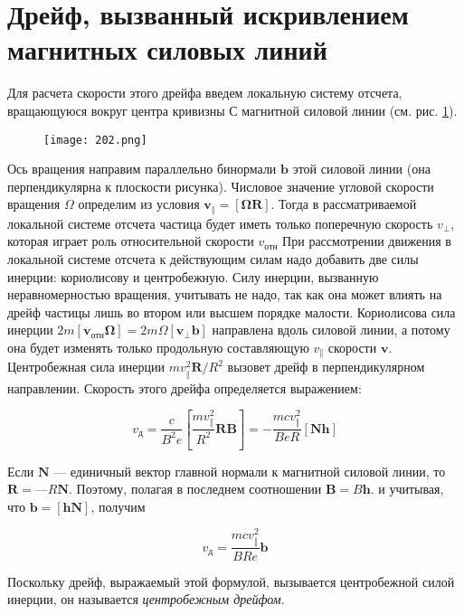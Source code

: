 \section{Дрейф, вызванный искривлением магнитных силовых линий} 

Для расчета скорости этого дрейфа введем локальную систему отсчета, вращающуюся вокруг центра кривизны $С$ магнитной силовой линии (см. рис. \ref{202}).

\begin{figure}[h!]
    \centering
    \texttt{[image: 202.png]}
    \caption{}
    \label{202}
\end{figure}

Ось вращения направим параллельно бинормали $\mathbf{b}$ этой силовой линии (она перпендикулярна к плоскости рисунка). Числовое значение угловой скорости вращения $\Omega$ определим из условия $\mathbf{v_{\Vert}} = [\mathbf{\Omega R}]$. Тогда в рассматриваемой локальной системе отсчета частица будет иметь только поперечную скорость $v_{\perp}$, которая играет роль относительной скорости $v_{отн}$ При рассмотрении движения в локальной системе отсчета к действующим силам надо добавить две силы инерции: кориолисову и центробежную. Силу инерции, вызванную неравномерностью вращения, учитывать не надо, так как она может влиять на дрейф частицы лишь во втором или высшем порядке малости. Кориолисова сила инерции $2m [\mathbf{v_{отн} \Omega}] = 2m \Omega [\mathbf{v_{\perp} b}]$ направлена вдоль силовой линии, а потому она будет изменять только продольную составляющую $v_{\Vert}$ скорости $\mathbf{v}$. Центробежная сила инерции $m v_{\Vert}^2 \mathbf{R} / R^2$ вызовет дрейф в перпендикулярном направлении. Скорость этого дрейфа определяется выражением:

\[
    v_д = \frac{c}{B^2 e} \left[ \frac{m v_{\Vert}^2}{R^2} \mathbf{R B} \right] = - \frac{m c v_{\Vert}^2}{B e R} [\mathbf{N h}]
\]

Если $\mathbf{N}$ — единичный вектор главной нормали к магнитной силовой линии, то $\mathbf{R} = — R \mathbf{N}$. Поэтому, полагая в последнем соотношении $\mathbf{B} = B \mathbf{h}$. и учитывая, что $\mathbf{b} = [\mathbf{hN}]$, получим

\begin{equation}
    v_д = \frac{m c v_{\Vert}^2}{B R e} \mathbf{b}
\end{equation}

Поскольку дрейф, выражаемый этой формулой, вызывается центробежной силой инерции, он называется \textit{центробежным дрейфом}.
